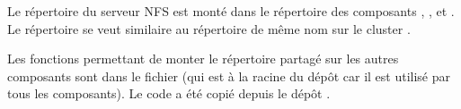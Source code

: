 Le répertoire  du serveur NFS est monté dans le répertoire 
des composants , ,  et .
Le répertoire  se veut similaire au répertoire de même nom sur le cluster .

Les fonctions permettant de monter le répertoire partagé sur les autres composants sont dans le fichier 
(qui est à la racine du dépôt  car il est utilisé par tous les composants).
Le code a été copié depuis le dépôt .

